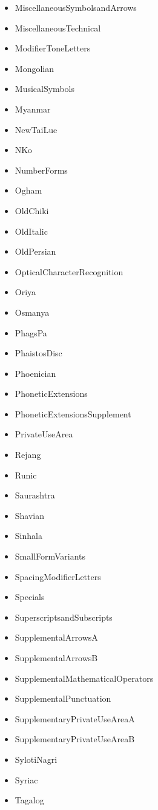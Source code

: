 ﻿\documentclass{article}
\newenvironment{itemlist}{%
  \begin{itemize}
	\setlength{\itemsep}{0pt}
	\setlength{\parsep}{0pt}
	\setlength{\topsep}{0pt}
	\setlength{\partopsep}{0pt}
	\setlength{\parskip}{0pt}
	\setlength{\labelsep}{5pt}}%
{
  \end{itemize}}
\begin{document}
\begin{multicols}{2}
\begin{itemlist}
				\item MiscellaneousSymbolsandArrows
				\item MiscellaneousTechnical
				\item ModifierToneLetters
				\item Mongolian
				\item MusicalSymbols
				\item Myanmar
				\item NewTaiLue
				\item NKo
				\item NumberForms
				\item Ogham
				\item OldChiki
				\item OldItalic
				\item OldPersian
				\item OpticalCharacterRecognition
				\item Oriya
				\item Osmanya
				\item PhagsPa
				\item PhaistosDisc
				\item Phoenician
				\item PhoneticExtensions
				\item PhoneticExtensionsSupplement
				\item PrivateUseArea
				\item Rejang
				\item Runic
				\item Saurashtra
				\item Shavian
				\item Sinhala
				\item SmallFormVariants
				\item SpacingModifierLetters
				\item Specials
				\item SuperscriptsandSubscripts
				\item SupplementalArrowsA
				\item SupplementalArrowsB
				\item SupplementalMathematicalOperators
				\item SupplementalPunctuation
				\item SupplementaryPrivateUseAreaA
				\item SupplementaryPrivateUseAreaB
				\item SylotiNagri
				\item Syriac
				\item Tagalog

\end{itemlist}
\end{multicols}
\end{document}
